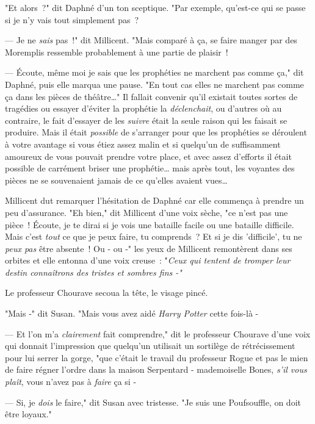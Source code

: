 "Et alors~?" dit Daphné d'un ton sceptique. "Par exemple, qu'est-ce qui se passe si je n'y vais tout simplement pas~?

--- Je ne \emph{sais} pas~!" dit Millicent. "Mais comparé à ça, se faire manger par des Moremplis ressemble probablement à une partie de plaisir~!

--- Écoute, même moi je sais que les prophéties ne marchent pas comme ça," dit Daphné, puis elle marqua une pause. "En tout cas elles ne marchent pas comme ça dans les pièces de théâtre…" Il fallait convenir qu'il existait toutes sortes de tragédies ou essayer d'éviter la prophétie la \emph{déclenchait}, ou d'autres où au contraire, le fait d'essayer de les \emph{suivre} était la seule raison qui les faisait se produire. Mais il était \emph{possible} de s'arranger pour que les prophéties se déroulent à votre avantage si vous étiez assez malin et si quelqu'un de suffisamment amoureux de vous pouvait prendre votre place, et avec assez d'efforts il était possible de carrément briser une prophétie… mais après tout, les voyantes des pièces ne se souvenaient jamais de ce qu'elles avaient vues…

Millicent dut remarquer l'hésitation de Daphné car elle commença à prendre un peu d'assurance. "Eh bien," dit Millicent d'une voix sèche, "ce n'est pas une pièce~! Écoute, je te dirai si je vois une bataille facile ou une bataille difficile. Mais c'est \emph{tout} ce que je peux faire, tu comprends~? Et si je dis 'difficile', tu ne \emph{peux pas} être absente~! Ou - ou -" les yeux de Millicent remontèrent dans ses orbites et elle entonna d'une voix creuse~: "\emph{Ceux qui tentent de tromper leur destin connaîtrons des tristes et sombres fins -"}

\later

Le professeur Chourave secoua la tête, le visage pincé.

"Mais -" dit Susan. "Mais vous avez aidé \emph{Harry Potter} cette fois-là -

--- Et l'on m'a \emph{clairement} fait comprendre," dit le professeur Chourave d'une voix qui donnait l'impression que quelqu'un utilisait un sortilège de rétrécissement pour lui serrer la gorge, "que c'était le travail du professeur Rogue et pas le mien de faire régner l'ordre dans la maison Serpentard - mademoiselle Bones, \emph{s'il vous plaît}, vous n'avez pas à \emph{faire} ça si -

--- Si, je \emph{dois} le faire," dit Susan avec tristesse. "Je suis une Poufsouffle, on doit être loyaux."

